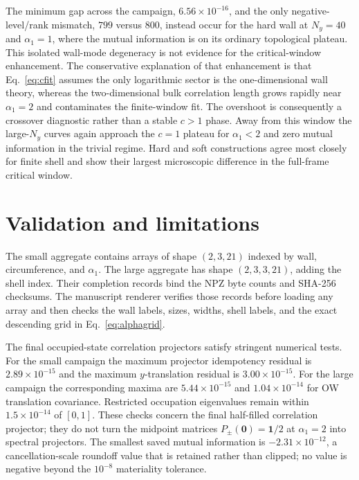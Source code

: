 \documentclass[aps,prb,twocolumn,nofootinbib,superscriptaddress,floatfix]{revtex4-2}
\begin{document}
The minimum gap across the campaign, $6.56\times10^{-16}$, and the only
negative-level/rank mismatch, $799$ versus $800$, instead occur for the hard
wall at $N_y=40$ and $\alpha_1=1$, where the mutual information is on its
ordinary topological plateau.  This isolated wall-mode degeneracy is not
evidence for the critical-window enhancement.  The conservative explanation
of that enhancement is that Eq.~\eqref{eq:cfit} assumes the only logarithmic
sector is the one-dimensional wall theory, whereas the two-dimensional bulk
correlation length grows rapidly near $\alpha_1=2$ and contaminates the
finite-window fit.  The overshoot is consequently a crossover diagnostic
rather than a stable $c>1$ phase.  Away from this window the large-$N_y$
curves again approach the $c=1$ plateau for $\alpha_1<2$ and zero mutual
information in the trivial regime.  Hard and soft constructions agree most
closely for finite shell and show their largest microscopic difference in the
full-frame critical window.

\section{Validation and limitations}
\label{sec:validation}

The small aggregate contains arrays of shape $(2,3,21)$ indexed by wall,
circumference, and $\alpha_1$.  The large aggregate has shape $(2,3,3,21)$,
adding the shell index.  Their completion records bind the NPZ byte counts and
SHA-256 checksums.  The manuscript renderer verifies those records before
loading any array and then checks the wall labels, sizes, widths, shell labels,
and the exact descending grid in Eq.~\eqref{eq:alphagrid}.

The final occupied-state correlation projectors satisfy stringent numerical
tests.  For the small campaign the maximum projector idempotency residual is
$2.89\times10^{-15}$ and the maximum $y$-translation residual is
$3.00\times10^{-15}$.  For the large campaign the corresponding maxima are
$5.44\times10^{-15}$ and $1.04\times10^{-14}$ for OW translation covariance.
Restricted occupation eigenvalues remain within $1.5\times10^{-14}$ of
$[0,1]$.  These checks concern the final half-filled correlation projector;
they do not turn the midpoint matrices $P_\pm(\bm0)=\mathbf{1}/2$ at
$\alpha_1=2$ into spectral projectors.  The smallest saved mutual information
is $-2.31\times10^{-12}$, a cancellation-scale roundoff value that is retained
rather than clipped; no value is negative beyond the $10^{-8}$ materiality
tolerance.
\end{document}

